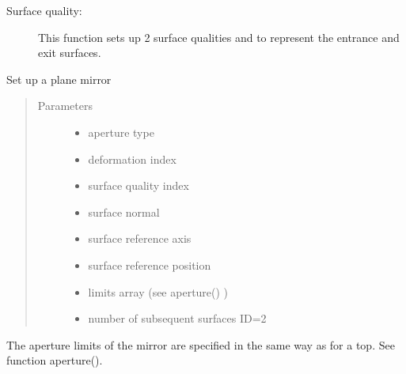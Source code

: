 \documentclass[letterpaper,10pt,english]{sphinxmanual}
\begin{document}
\begin{fulllineitems}
\begin{quote}
\begin{description}
\begin{itemize}
\end{itemize}

\end{description}\end{quote}
\begin{description}
\item[{Surface quality:}] \leavevmode
This function sets up 2 surface qualities  and  to
represent the entrance and exit surfaces.

\end{description}

\end{fulllineitems}


\begin{fulllineitems}
\label{\detokenize{xsrt_functions:xsrt.mirror}}
Set up a plane mirror
\begin{quote}\begin{description}
\item[{Parameters}] \leavevmode\begin{itemize}
\item {} 
 \textendash{} aperture type

\item {} 
 \textendash{} deformation index

\item {} 
 \textendash{} surface quality index

\item {} 
 \textendash{} surface normal

\item {} 
 \textendash{} surface reference axis

\item {} 
 \textendash{} surface reference position

\item {} 
 \textendash{} limits array (see aperture() )

\item {} 
 \textendash{} number of subsequent surfaces ID=2

\end{itemize}

\end{description}\end{quote}

The aperture limits of the mirror are specified in the same way as
for a top. See function aperture().

\end{fulllineitems}
\end{document}
